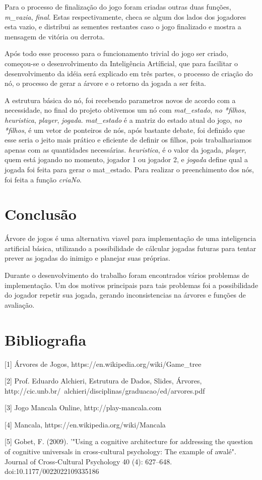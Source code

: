 \documentclass[a4paper, 12pt]{article}
\begin{document}
		\textrm{Para o processo de finalização do jogo foram criadas outras duas funções, \emph{m_vazia}, \emph{final}. Estas respectivamente, checa se algum dos lados dos jogadores esta vazio, e distribui as sementes restantes caso o jogo finalizado e mostra a mensagem de vitória ou derrota.}

		\textrm{Após todo esse processo para o funcionamento trivial do jogo ser criado, começou-se o desenvolvimento da Inteligência Artíficial, que para facilitar o desenvolvimento da idéia será explicado em três partes, o processo de criação do nó, o processo de gerar a árvore e o retorno da jogada a ser feita.}
		
		\textrm{A estrutura básica do nó, foi recebendo parametros novos de acordo com a necessidade, no final do projeto obtivemos um nó com \emph{mat_estado}, \emph{no *filhos}, \emph{heuristica}, \emph{player}, \emph{jogada}. \emph{mat_estado} é a matriz do estado atual do jogo, \emph{no *filhos}, é um vetor de ponteiros de nós, após bastante debate, foi definido que esse seria o jeito mais prático e eficiente de definir os filhos, pois trabalhariamos apenas com as quantidades necessárias. \emph{heuristica}, é o valor da jogada, \emph{player}, quem está jogando no momento, jogador 1 ou jogador 2, e \emph{jogada} define qual a jogada foi feita para gerar o mat_estado. Para realizar o preenchimento dos nós, foi feita a função \emph{criaNo}.}
	
		\textrm{} %
		
		\texrm{} %

	\section{Conclusão}
		\textrm{Árvore de jogos é uma alternativa viavel para implementação de uma inteligencia artificial básica, utilizando a possibilidade de cálcular jogadas futuras para tentar prever as jogadas do inimigo e planejar suas próprias.}
		
		\textrm{Durante o desenvolvimento do trabalho foram encontrados vários problemas de implementação. Um dos motivos principais para tais problemas foi a possibilidade do jogador repetir sua jogada, gerando inconsistencias na árvores e funções de avaliação.}
		
	\section{Bibliografia}
	    [1] Árvores de Jogos, https://en.wikipedia.org/wiki/Game_tree
	
		[2] Prof. Eduardo Alchieri, Estrutura de Dados, Slides, Árvores, http://cic.unb.br/~alchieri/disciplinas/graduacao/ed/arvores.pdf 
		
		[3] Jogo Mancala Online, http://play-mancala.com
		
		[4] Mancala, https://en.wikipedia.org/wiki/Mancala
	
		[5] Gobet, F. (2009). '"Using a cognitive architecture for addressing the question of cognitive universals in cross-cultural psychology: The example of awalé". Journal of Cross-Cultural Psychology 40 (4): 627–648. doi:10.1177/0022022109335186
		
		
		
\end{document}
